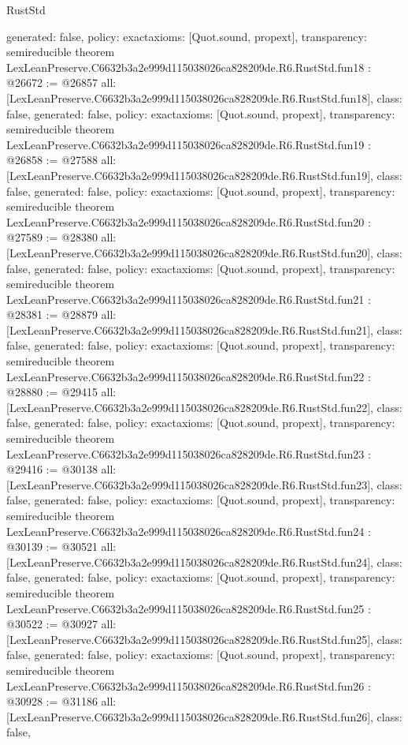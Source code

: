 \begin{lexlean}{RustStd}
\begin{coremodule}
{  generated: false,
  policy: exact{axioms: [Quot.sound, propext]},
  transparency: semireducible
}
theorem LexLeanPreserve.C6632b3a2e999d115038026ca828209de.R6.RustStd.fun18 : @26672 := @26857 {
  all: [LexLeanPreserve.C6632b3a2e999d115038026ca828209de.R6.RustStd.fun18],
  class: false,
  generated: false,
  policy: exact{axioms: [Quot.sound, propext]},
  transparency: semireducible
}
theorem LexLeanPreserve.C6632b3a2e999d115038026ca828209de.R6.RustStd.fun19 : @26858 := @27588 {
  all: [LexLeanPreserve.C6632b3a2e999d115038026ca828209de.R6.RustStd.fun19],
  class: false,
  generated: false,
  policy: exact{axioms: [Quot.sound, propext]},
  transparency: semireducible
}
theorem LexLeanPreserve.C6632b3a2e999d115038026ca828209de.R6.RustStd.fun20 : @27589 := @28380 {
  all: [LexLeanPreserve.C6632b3a2e999d115038026ca828209de.R6.RustStd.fun20],
  class: false,
  generated: false,
  policy: exact{axioms: [Quot.sound, propext]},
  transparency: semireducible
}
theorem LexLeanPreserve.C6632b3a2e999d115038026ca828209de.R6.RustStd.fun21 : @28381 := @28879 {
  all: [LexLeanPreserve.C6632b3a2e999d115038026ca828209de.R6.RustStd.fun21],
  class: false,
  generated: false,
  policy: exact{axioms: [Quot.sound, propext]},
  transparency: semireducible
}
theorem LexLeanPreserve.C6632b3a2e999d115038026ca828209de.R6.RustStd.fun22 : @28880 := @29415 {
  all: [LexLeanPreserve.C6632b3a2e999d115038026ca828209de.R6.RustStd.fun22],
  class: false,
  generated: false,
  policy: exact{axioms: [Quot.sound, propext]},
  transparency: semireducible
}
theorem LexLeanPreserve.C6632b3a2e999d115038026ca828209de.R6.RustStd.fun23 : @29416 := @30138 {
  all: [LexLeanPreserve.C6632b3a2e999d115038026ca828209de.R6.RustStd.fun23],
  class: false,
  generated: false,
  policy: exact{axioms: [Quot.sound, propext]},
  transparency: semireducible
}
theorem LexLeanPreserve.C6632b3a2e999d115038026ca828209de.R6.RustStd.fun24 : @30139 := @30521 {
  all: [LexLeanPreserve.C6632b3a2e999d115038026ca828209de.R6.RustStd.fun24],
  class: false,
  generated: false,
  policy: exact{axioms: [Quot.sound, propext]},
  transparency: semireducible
}
theorem LexLeanPreserve.C6632b3a2e999d115038026ca828209de.R6.RustStd.fun25 : @30522 := @30927 {
  all: [LexLeanPreserve.C6632b3a2e999d115038026ca828209de.R6.RustStd.fun25],
  class: false,
  generated: false,
  policy: exact{axioms: [Quot.sound, propext]},
  transparency: semireducible
}
theorem LexLeanPreserve.C6632b3a2e999d115038026ca828209de.R6.RustStd.fun26 : @30928 := @31186 {
  all: [LexLeanPreserve.C6632b3a2e999d115038026ca828209de.R6.RustStd.fun26],
  class: false,
}
\end{coremodule}
\end{lexlean}
